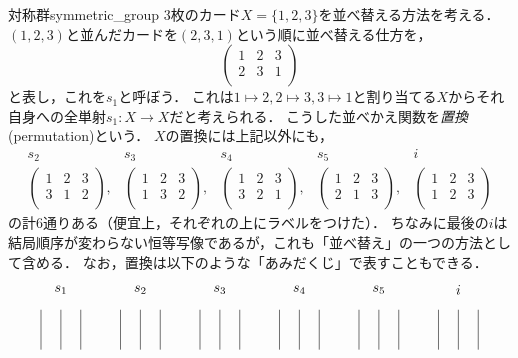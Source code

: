 \documentclass[11pt,a4paper, dvipdfmx]{jsarticle}
\begin{document}
\begin{rei}{対称群}{symmetric_group}
    3枚のカード$X = \{1, 2, 3 \}$を並べ替える方法を考える．$(1,2,3)$と並んだカードを$(2,3,1)$という順に並べ替える仕方を，
    \[ \begin{pmatrix}
        1 & 2 & 3 \\
        2 & 3 & 1 \\
    \end{pmatrix}\]
    と表し，これを$s_1$と呼ぼう．
    これは$1 \mapsto 2, 2 \mapsto 3, 3 \mapsto 1$と割り当てる$X$からそれ自身への全単射$s_1:X \to X$だと考えられる．
    こうした並べかえ関数を\emph{置換}(permutation)という．
    $X$の置換には上記以外にも，
    \[\begin{array}{ccccc}
        s_2 & s_3 & s_4 & s_5 & i \\
    \begin{pmatrix}
        1 & 2 & 3 \\
        3 & 1 & 2 \\
    \end{pmatrix}, &
    \begin{pmatrix}
        1 & 2 & 3 \\
        1 & 3 & 2 \\
    \end{pmatrix}, &
    \begin{pmatrix}
        1 & 2 & 3 \\
        3 & 2 & 1 \\
    \end{pmatrix}, &
    \begin{pmatrix}
        1 & 2 & 3 \\
        2 & 1 & 3 \\
    \end{pmatrix}, &
    \begin{pmatrix}
        1 & 2 & 3 \\
        1 & 2 & 3 \\
    \end{pmatrix}\end{array}\]
    の計6通りある（便宜上，それぞれの上にラベルをつけた）．
    ちなみに最後の$i$は結局順序が変わらない恒等写像であるが，これも「並べ替え」の一つの方法として含める．
    なお，置換は以下のような「あみだくじ」で表すこともできる．
    \[\begin{tikzpicture}
        \foreach \x in {0,.5,1, 2,2.5,3, 4,4.5,5, 6,6.5,7, 8,8.5,9, 10,10.5,11} {
            \draw (\x,0) -- (\x,1);
        }
        \node (s1) at (.5,1.5) {$s_1$};
        \node (s2) at (2.5,1.5) {$s_2$};
        \node (s3) at (4.5,1.5) {$s_3$};
        \node (s4) at (6.5,1.5) {$s_4$};
        \node (s5) at (8.5,1.5) {$s_5$};
        \node (i) at (10.5,1.5) {$i$};
    

\end{tikzpicture}\]
\end{rei}
\end{document}

